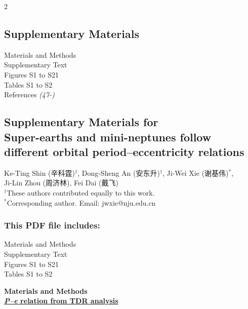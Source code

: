 \documentclass[10pt]{article}
\def\scititle{
Super-earths and mini-neptunes follow different orbital period--eccentricity relations
}
\begin{document}
\begin{multicols}{2}
\subsection*{Supplementary Materials}
\noindent Materials and Methods\\
Supplementary Text\\
Figures S1 to S21\\
Tables S1 to S2\\
References \textit{(47-)}\\



\end{multicols}
\newpage



\renewcommand{\thefigure}{S\arabic{figure}}
\renewcommand{\thetable}{S\arabic{table}}
\renewcommand{\theequation}{S\arabic{equation}}
\renewcommand{\thepage}{S\arabic{page}}
\setcounter{figure}{0}
\setcounter{table}{0}
\setcounter{equation}{0}
\setcounter{page}{1}




\begin{center}
\section*{Supplementary Materials for\\ \scititle}




Ke-Ting Shin (辛科霆)$^{\dagger}$,
Dong-Sheng An (安东升)$^{\dagger}$,
Ji-Wei Xie (谢基伟)$^{\ast}$,\\
Ji-Lin Zhou (周济林),
Fei Dai (戴飞)\\
\small$^\dagger$These authors contributed equally to this work.\\
\small$^\ast$Corresponding author. Email: jwxie@nju.edu.cn
\end{center}




\subsubsection*{This PDF file includes:}
\noindent Materials and Methods\\
Supplementary Text\\
Figures S1 to S21\\
Tables S1 to S2\\
\newpage

{\noindent \bf \fontsize{13pt}{15pt} \selectfont Materials and Methods}\\
\hyperlink{s1}{\bf \emph{P--e} relation from TDR analysis}
\end{document}
